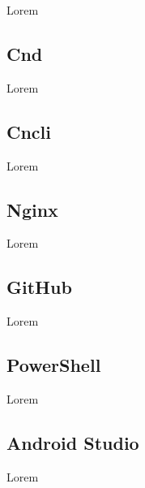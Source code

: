 Lorem

\subsection*{Cnd}

Lorem

\subsection*{Cncli}

Lorem

\subsection*{Nginx}

Lorem

\subsection*{GitHub}

Lorem

\subsection*{PowerShell}

Lorem

\subsection*{Android Studio}

Lorem
